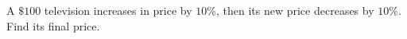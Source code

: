 A $\$100$ television increases in price by $10\%$, then its new price decreases by $10\%$. Find its final price.
